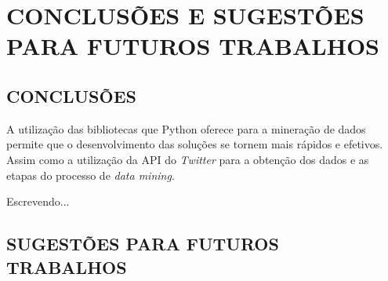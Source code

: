 \chapter{CONCLUSÕES E SUGESTÕES PARA FUTUROS TRABALHOS}\label{ch:conclusao}
\section{CONCLUSÕES} 
A utilização das bibliotecas que Python oferece para a mineração de dados permite que o desenvolvimento das soluções se tornem mais rápidos e efetivos. Assim como a utilização da API do \textit{Twitter} para a obtenção dos dados e as etapas do processo de \textit{data mining}. 

Escrevendo...

\section{SUGESTÕES PARA FUTUROS TRABALHOS}